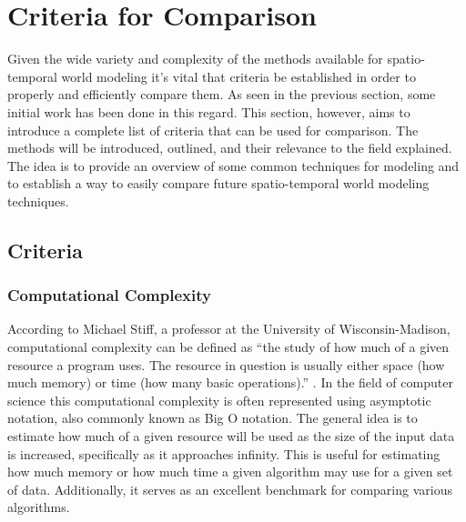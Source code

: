 
  \chapter{Criteria for Comparison}

  Given the wide variety and complexity of the methods available for
  spatio-temporal world modeling it's vital that criteria be established in
  order to properly and efficiently compare them. As seen in the previous
  section, some initial work has been done in this regard. This section,
  however, aims to introduce a complete list of criteria that can be used
  for comparison. The methods will be introduced, outlined, and their relevance
  to the field explained. The idea is to provide an overview of some common
  techniques for modeling and to establish a way to easily compare future
  spatio-temporal world modeling techniques. \\

  \section{ Criteria }

  \subsection{ Computational Complexity }
  According to Michael Stiff, a professor at the University of Wisconsin-Madison,
  computational complexity can be defined as
  ``the study of how much of a given resource a program uses. The resource in question is usually either space (how much memory) or time (how many basic operations).''
  \cite{ComplexityUW}. In the field of computer science this computational
  complexity is often represented using asymptotic notation, also commonly
  known as Big O notation. The general idea is to estimate how much of a given
  resource will be used as the size of the input data is increased, specifically
  as it approaches infinity. This is useful for estimating how much memory or
  how much time a given algorithm may use for a given set of data.
  Additionally, it serves as an excellent benchmark for comparing various
  algorithms.\\

